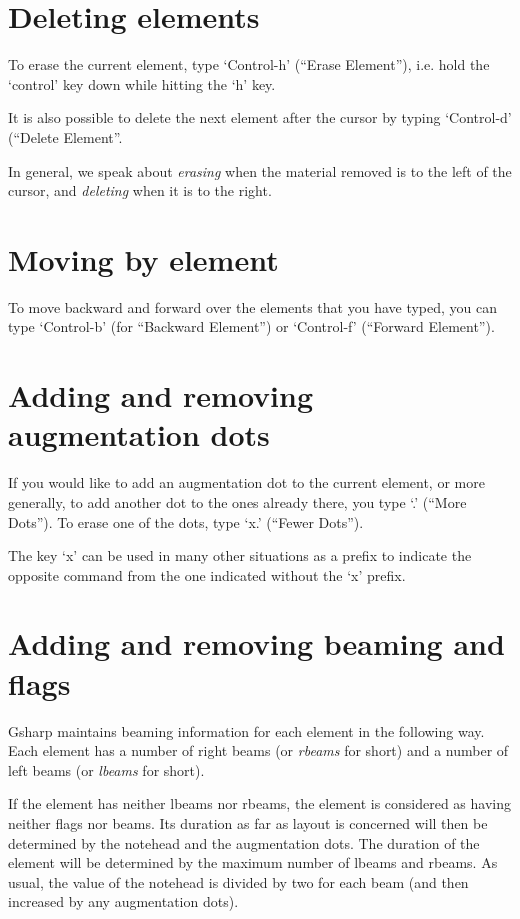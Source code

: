 \documentclass[11pt]{book}
\def\gs{Gsharp}
\def\kbd#1{`#1'}
\def\command#1{``#1''}
\begin{document}
\section{Deleting elements}

To erase the current element, type \kbd{Control-h} (\command{Erase
Element}), i.e. hold the \kbd{control} key down while hitting the
\kbd{h} key.

It is also possible to delete the next element after the cursor by
typing \kbd{Control-d} (\command{Delete Element}. 

In general, we speak about \emph{erasing} when the
material removed is to the left of the cursor, and
\emph{deleting} when it is to the right. 

\section{Moving by element}

To move backward and forward over the elements that you have typed,
you can type \kbd{Control-b} (for \command{Backward Element}) or
\kbd{Control-f} (\command{Forward Element}). 

\section{Adding and removing augmentation dots}

If you would like to add an augmentation dot to the current element,
or more generally, to add another dot to the ones already there, you
type \kbd{.} (\command{More Dots}).  To erase one of the dots, type
\kbd{x.} (\command{Fewer Dots}).

The key \kbd{x} can be used in many other situations as a prefix to
indicate the opposite command from the one indicated without the
\kbd{x} prefix.

\section{Adding and removing beaming and flags}

{\gs} maintains beaming information for each element in the following
way.  Each element has a number of right beams (or \emph{rbeams} for
short) and a number of left beams (or \emph{lbeams} for short). 

If the element has neither lbeams nor rbeams, the element is
considered as having neither flags nor beams.  Its duration as far as
layout is concerned will then be determined by the notehead and the
augmentation dots.  The duration of the element will be determined by
the maximum number of lbeams and rbeams.  As usual, the value of the
notehead is divided by two for each beam (and then increased by any
augmentation dots).
\end{document}
